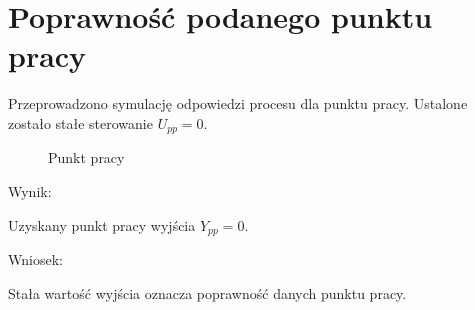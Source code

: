 \section{Poprawność podanego punktu pracy}
\label{projekt:zad1}
Przeprowadzono symulację odpowiedzi procesu dla punktu pracy. 
Ustalone zostało stałe sterowanie $U_{pp} = 0$.

\begin{figure}[H] 
    \centering
    
    \caption{Punkt pracy}
    \label{projekt:zad1:figure:zad1}
\end{figure}


Wynik: 

\indent Uzyskany punkt pracy wyjścia $Y_{pp}=0$.


Wniosek: 

\indent Stała wartość wyjścia oznacza poprawność danych punktu pracy.

\newpage
